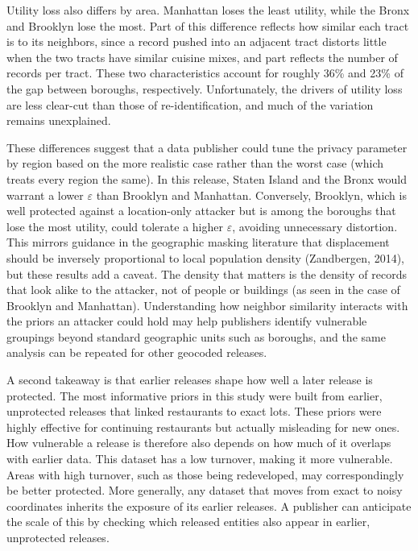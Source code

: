 \documentclass[11pt]{article}
\begin{document}
Utility loss also differs by area. Manhattan loses the least utility, while the Bronx and Brooklyn lose the most. Part of this difference reflects how similar each tract is to its neighbors, since a record pushed into an adjacent tract distorts little when the two tracts have similar cuisine mixes, and part reflects the number of records per tract. These two characteristics account for roughly 36\% and 23\% of the gap between boroughs, respectively. Unfortunately, the drivers of utility loss are less clear-cut than those of re-identification, and much of the variation remains unexplained.

These differences suggest that a data publisher could tune the privacy parameter by region based on the more realistic case rather than the worst case (which treats every region the same). In this release, Staten Island and the Bronx would warrant a lower $\varepsilon$ than Brooklyn and Manhattan. Conversely, Brooklyn, which is well protected against a location-only attacker but is among the boroughs that lose the most utility, could tolerate a higher $\varepsilon$, avoiding unnecessary distortion. This mirrors guidance in the geographic masking literature that displacement should be inversely proportional to local population density (Zandbergen, 2014), but these results add a caveat. The density that matters is the density of records that look alike to the attacker, not of people or buildings (as seen in the case of Brooklyn and Manhattan). Understanding how neighbor similarity interacts with the priors an attacker could hold may help publishers identify vulnerable groupings beyond standard geographic units such as boroughs, and the same analysis can be repeated for other geocoded releases.

A second takeaway is that earlier releases shape how well a later release is protected. The most informative priors in this study were built from earlier, unprotected releases that linked restaurants to exact lots. These priors were highly effective for continuing restaurants but actually misleading for new ones. How vulnerable a release is therefore also depends on how much of it overlaps with earlier data. This dataset has a low turnover, making it more vulnerable. Areas with high turnover, such as those being redeveloped, may correspondingly be better protected. More generally, any dataset that moves from exact to noisy coordinates inherits the exposure of its earlier releases. A publisher can anticipate the scale of this by checking which released entities also appear in earlier, unprotected releases.
\end{document}
